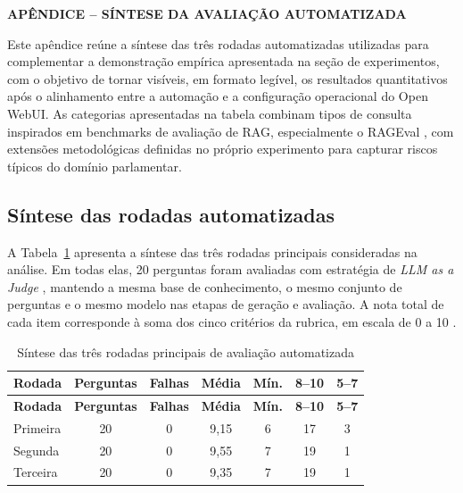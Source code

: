 \appendix
\clearpage
{}
{}
\begin{center}
\textbf{APÊNDICE  -- SÍNTESE DA AVALIAÇÃO AUTOMATIZADA}
\end{center}
\label{sec:apendice-avaliacao}

Este apêndice reúne a síntese das três rodadas automatizadas utilizadas para complementar a demonstração empírica apresentada na seção de experimentos, com o objetivo de tornar visíveis, em formato legível, os resultados quantitativos após o alinhamento entre a automação e a configuração operacional do Open WebUI. As categorias apresentadas na tabela combinam tipos de consulta inspirados em benchmarks de avaliação de RAG, especialmente o RAGEval \parencite{zhuEtAl2025rageval}, com extensões metodológicas definidas no próprio experimento para capturar riscos típicos do domínio parlamentar.

\subsection{Síntese das rodadas automatizadas}

A Tabela~\ref{tab:rodadas-avaliacao} apresenta a síntese das três rodadas principais consideradas na análise. Em todas elas, 20 perguntas foram avaliadas com estratégia de \textit{LLM as a Judge} \parencite{liuEtAl2025judgeRag}, mantendo a mesma base de conhecimento, o mesmo conjunto de perguntas e o mesmo modelo nas etapas de geração e avaliação. A nota total de cada item corresponde à soma dos cinco critérios da rubrica, em escala de 0 a 10 \parencite{liuEtAl2023geval}.

\begingroup
\footnotesize
\begin{longtable}{@{}>{\raggedright\arraybackslash}p{}cccccc@{}}
\caption{Síntese das três rodadas principais de avaliação automatizada}
\label{tab:rodadas-avaliacao}\\
\textbf{Rodada} & \textbf{Perguntas} & \textbf{Falhas} & \textbf{Média} & \textbf{Mín.} & \textbf{8--10} & \textbf{5--7} \\
\hline
\endfirsthead
\textbf{Rodada} & \textbf{Perguntas} & \textbf{Falhas} & \textbf{Média} & \textbf{Mín.} & \textbf{8--10} & \textbf{5--7} \\
\hline
\endhead
Primeira & 20 & 0 & 9,15 & 6 & 17 & 3 \\
Segunda & 20 & 0 & 9,55 & 7 & 19 & 1 \\
Terceira & 20 & 0 & 9,35 & 7 & 19 & 1 \\
\hline
\end{longtable}
\endgroup

